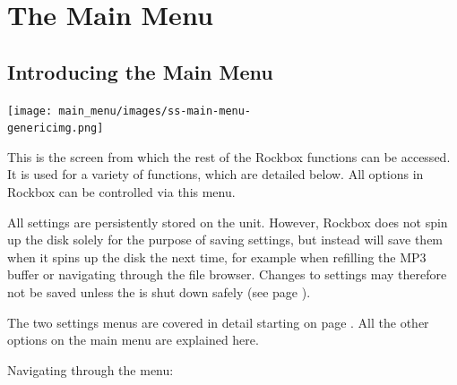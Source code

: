 \chapter{The Main Menu}

\section{Introducing the Main Menu}
\begin{center}
  \texttt{[image: main\_menu/images/ss-main-menu-\\genericimg.png]}
\end{center}
This is the screen from which the rest of the Rockbox functions can be accessed.  It is used for a variety of functions, which are detailed below. All options in Rockbox can be controlled via this menu.

All settings are persistently stored on the unit. However, Rockbox does not spin up the disk solely for the purpose of saving settings, but instead will save them when it spins up the disk the next time, for example when refilling the MP3 buffer or navigating through the file browser. Changes to settings may therefore not be saved unless the \dap is shut down safely (see page \pageref{ref:Safeshutdown}).

The two settings menus are covered in detail starting on page \pageref{ref:configure_rockbox}. All the other options on the main menu are explained here.

Navigating through the menu:

